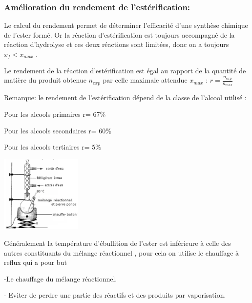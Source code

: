 \documentclass[12pt]{article}
\begin{document}
\subsubsection{Amélioration du rendement de l'estérification:}

Le calcul du rendement permet de déterminer l'efficacité d'une synthèse chimique de l'ester formé.
Or la réaction d'estérification est toujours accompagné de la réaction d'hydrolyse et ces deux réactions sont limitées, donc on a toujours $x_f< x_{max}$ .

Le rendement de la réaction d'estérification est égal au rapport de la quantité de matière du produit obtenue $n_{exp}$ par celle maximale attendue $x_{max}$ : $r = \frac{n_{exp}}{n_{max}}$

	\begin{tcolorbox}
Remarque: le rendement de l'estérification dépend de la classe de l'alcool utilisé :

Pour les alcools primaires r= 67\%

Pour les alcools secondaires r= 60\%

Pour les alcools tertiaires r= 5\%
	\end{tcolorbox}

\begin{center}
	\includegraphics[width=0.3\textwidth]{./img/img03.png}
\end{center}
\begin{tcolorbox}[colback=pink!10!white,
                  colframe=blue!15!gray,
                  title=Remarque  -3- :
                 ]

 Généralement la température d'ébullition de l'ester est inférieure à celle des autres constituants du mélange
réactionnel , pour cela on utilise le chauffage à reflux qui a pour but

-Le chauffage du mélange réactionnel.

- Eviter de perdre une partie des réactifs et des produits par vaporisation.

			 \end{tcolorbox}
\end{document}
